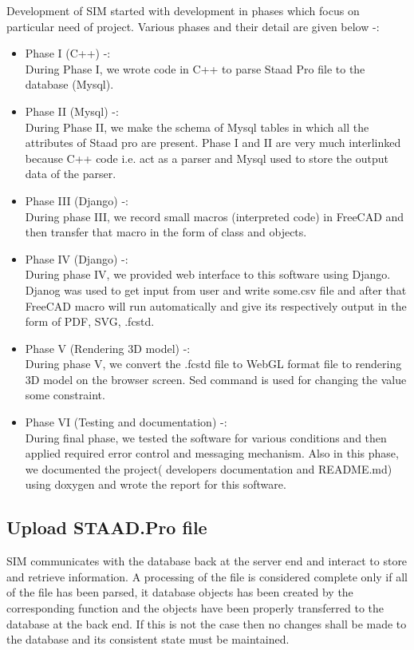 Development of SIM started with development in phases which focus on particular need of project.
Various phases and their detail are given below -:
\begin{itemize}
\item Phase I (C++) -: \\
	During Phase I, we wrote code in C++ to parse Staad Pro file to the database (Mysql).
\item Phase II (Mysql) -: \\
    During Phase II, we make the schema of Mysql tables in which all the attributes of 
    Staad pro are present. Phase I and II are very much interlinked because C++ code i.e. 
    act as a parser and Mysql used to store the output data of the parser.
\item Phase III (Django) -: \\
    During phase III, we record small macros (interpreted code) in FreeCAD and then transfer that macro
    in the form of class and objects.
\item Phase IV (Django) -: \\
    During phase IV, we provided web interface to this software using Django. Djanog was used
    to get input from user and write some.csv file and after that FreeCAD macro will run
    automatically and give its respectively output in the form of PDF, SVG, .fcstd.
\item Phase V (Rendering 3D model) -: \\
    During phase V, we convert the .fcstd file to WebGL format file to rendering 3D 
    model on the browser screen. Sed command is used for changing the value some 
    constraint.
\item Phase VI (Testing and documentation) -: \\ 
    During final phase, we tested the software for various conditions and then applied required error control and messaging
    mechanism. Also in this phase, we documented the project( developers documentation and README.md) using doxygen and wrote the report for this software.    
\end{itemize}     

\subsection{Upload STAAD.Pro file}
SIM communicates with the database back at the server end and interact to store and retrieve information. A processing of the file is considered complete only if all of the file has been parsed, it database objects has been created by the corresponding function and the objects have been properly transferred to the database at the back end. If this is not the case then no changes shall be made to the database and its consistent state must be maintained.

